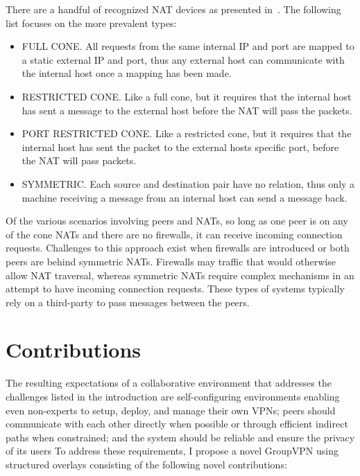 There are a handful of recognized NAT devices as presented in~\cite{stun,
p2p_nats_rfc}.  The following list focuses on the more prevalent types:

\begin{itemize}

\item FULL CONE. All requests from the same internal IP and port are mapped to
a static external IP and port, thus any external host can communicate with the
internal host once a mapping has been made.

\item RESTRICTED CONE. Like a full cone, but it requires that the internal host
has sent a message to the external host before the NAT will pass the packets.

\item PORT RESTRICTED CONE. Like a restricted cone, but it requires that the
internal host has sent the packet to the external hosts specific port, before
the NAT will pass packets.

\item SYMMETRIC. Each source and destination pair have no relation, thus only a
machine receiving a message from an internal host can send a message back.

\end{itemize}

Of the various scenarios involving peers and NATs, so long as one peer is on
any of the cone NATs and there are no firewalls, it can receive incoming
connection requests.  Challenges to this approach exist when firewalls are
introduced or both peers are behind symmetric NATs.  Firewalls may traffic that
would otherwise allow NAT traversal, whereas symmetric NATs require complex
mechanisms in an attempt to have incoming connection requests.  These types of
systems typically rely on a third-party to pass messages between the peers.

\section{Contributions}

The resulting expectations of a collaborative environment that addresses the
challenges listed in the introduction are self-configuring environments
enabling even non-experts to setup, deploy, and manage their own VPNs; peers
should communicate with each other directly when possible or through efficient
indirect paths when constrained; and the system should be reliable and ensure
the privacy of its users To address these requirements, I propose a novel
GroupVPN using structured overlays consisting of the following novel
contributions:

